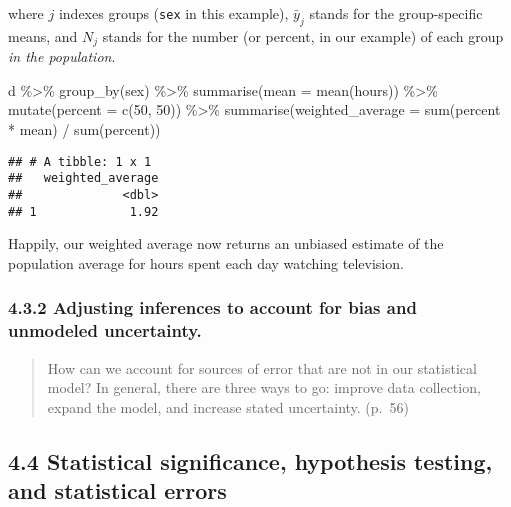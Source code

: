 \documentclass[
]{article}
\newenvironment{Shaded}{\begin{snugshade}}{\end{snugshade}}
\newcommand{\AttributeTok}[1]{\textcolor[rgb]{0.77,0.63,0.00}{#1}}
\newcommand{\DecValTok}[1]{\textcolor[rgb]{0.00,0.00,0.81}{#1}}
\newcommand{\FunctionTok}[1]{\textcolor[rgb]{0.00,0.00,0.00}{#1}}
\newcommand{\NormalTok}[1]{#1}
\newcommand{\SpecialCharTok}[1]{\textcolor[rgb]{0.00,0.00,0.00}{#1}}
\begin{document}
where \(j\) indexes groups (\texttt{sex} in this example), \(\bar y_j\)
stands for the group-specific means, and \(N_j\) stands for the number
(or percent, in our example) of each group \emph{in the population}.

\begin{Shaded}
\begin{Highlighting}[]
\NormalTok{d }\SpecialCharTok{\%\textgreater{}\%} 
  \FunctionTok{group\_by}\NormalTok{(sex) }\SpecialCharTok{\%\textgreater{}\%} 
  \FunctionTok{summarise}\NormalTok{(}\AttributeTok{mean =} \FunctionTok{mean}\NormalTok{(hours)) }\SpecialCharTok{\%\textgreater{}\%} 
  \FunctionTok{mutate}\NormalTok{(}\AttributeTok{percent =} \FunctionTok{c}\NormalTok{(}\DecValTok{50}\NormalTok{, }\DecValTok{50}\NormalTok{)) }\SpecialCharTok{\%\textgreater{}\%} 
  \FunctionTok{summarise}\NormalTok{(}\AttributeTok{weighted\_average =} \FunctionTok{sum}\NormalTok{(percent }\SpecialCharTok{*}\NormalTok{ mean) }\SpecialCharTok{/} \FunctionTok{sum}\NormalTok{(percent))}
\end{Highlighting}
\end{Shaded}

\begin{verbatim}
## # A tibble: 1 x 1
##   weighted_average
##              <dbl>
## 1             1.92
\end{verbatim}

Happily, our weighted average now returns an unbiased estimate of the
population average for hours spent each day watching television.

\hypertarget{adjusting-inferences-to-account-for-bias-and-unmodeled-uncertainty.}{%
\subsubsection{4.3.2 Adjusting inferences to account for bias and
unmodeled
uncertainty.}\label{adjusting-inferences-to-account-for-bias-and-unmodeled-uncertainty.}}

\begin{quote}
How can we account for sources of error that are not in our statistical
model? In general, there are three ways to go: improve data collection,
expand the model, and increase stated uncertainty. (p.~56)
\end{quote}

\hypertarget{statistical-significance-hypothesis-testing-and-statistical-errors}{%
\subsection{4.4 Statistical significance, hypothesis testing, and
statistical
errors}\label{statistical-significance-hypothesis-testing-and-statistical-errors}}
\end{document}
